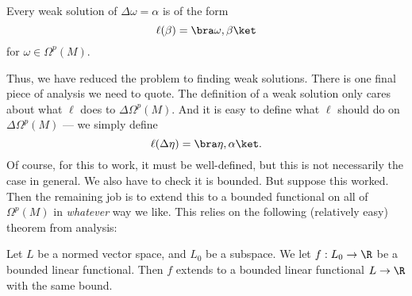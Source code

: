 \documentclass[a4paper]{article}
\begin{document}
\begin{thm}
  Every weak solution of $\Delta \omega = \alpha$ is of the form
  \[
    \ell(\beta) = \bra \omega, \beta\ket
  \]
  for $\omega \in \Omega^p(M)$.
\end{thm}

Thus, we have reduced the problem to finding weak solutions. There is one final piece of analysis we need to quote. The definition of a weak solution only cares about what $\ell$ does to $\Delta \Omega^p(M)$. And it is easy to define what $\ell$ should do on $\Delta \Omega^p(M)$ --- we simply define
\[
  \ell(\Delta \eta) = \bra \eta, \alpha\ket.
\]
Of course, for this to work, it must be well-defined, but this is not necessarily the case in general. We also have to check it is bounded. But suppose this worked. Then the remaining job is to extend this to a bounded functional on all of $\Omega^p(M)$ in \emph{whatever} way we like. This relies on the following (relatively easy) theorem from analysis:

\begin{thm}
  Let $L$ be a normed vector space, and $L_0$ be a subspace. We let $f: L_0 \to \R$ be a bounded linear functional. Then $f$ extends to a bounded linear functional $L \to \R$ with the same bound.
\end{thm}
\end{document}

